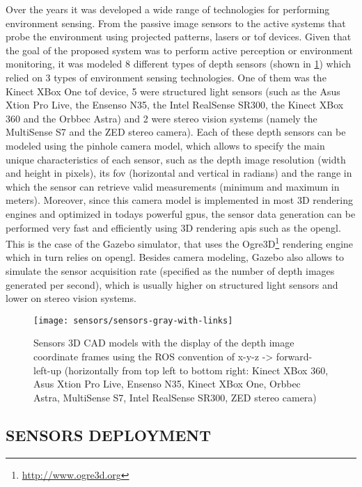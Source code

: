 Over the years it was developed a wide range of technologies for performing environment sensing. From the passive image sensors to the active systems that probe the environment using projected patterns, lasers or \gls{tof} devices. Given that the goal of the proposed system was to perform active perception or environment monitoring, it was modeled 8 different types of depth sensors (shown in \cref{fig:sensors}) which relied on 3 types of environment sensing technologies. One of them was the Kinect XBox One \gls{tof} device, 5 were structured light sensors (such as the Asus Xtion Pro Live, the Ensenso N35, the Intel RealSense SR300, the Kinect XBox 360 and the Orbbec Astra) and 2 were stereo vision systems (namely the MultiSense S7 and the ZED stereo camera). Each of these depth sensors can be modeled using the pinhole camera model, which allows to specify the main unique characteristics of each sensor, such as the depth image resolution (width and height in pixels), its \gls{fov} (horizontal and vertical in radians) and the range in which the sensor can retrieve valid measurements (minimum and maximum in meters). Moreover, since this camera model is implemented in most 3D rendering engines and optimized in todays powerful \glspl{gpu}, the sensor data generation can be performed very fast and efficiently using 3D rendering \glspl{api} such as the \gls{opengl}. This is the case of the Gazebo simulator, that uses the Ogre3D\footnote{\url{http://www.ogre3d.org}} rendering engine which in turn relies on \gls{opengl}. Besides camera modeling, Gazebo also allows to simulate the sensor acquisition rate (specified as the number of depth images generated per second), which is usually higher on structured light sensors and lower on stereo vision systems.

\begin{figure}
	\centering
	\texttt{[image: sensors/sensors-gray-with-links]}
	\caption{Sensors 3D CAD models with the display of the depth image coordinate frames using the ROS convention of x-y-z -> forward-left-up (horizontally from top left to bottom right: Kinect XBox 360, Asus Xtion Pro Live, Ensenso N35, Kinect XBox One, Orbbec Astra, MultiSense S7, Intel RealSense SR300, ZED stereo camera)}
	\label{fig:sensors}
\end{figure}


\subsection{\uppercase{Sensors deployment}}\label{subsec:sensors-deployment}

